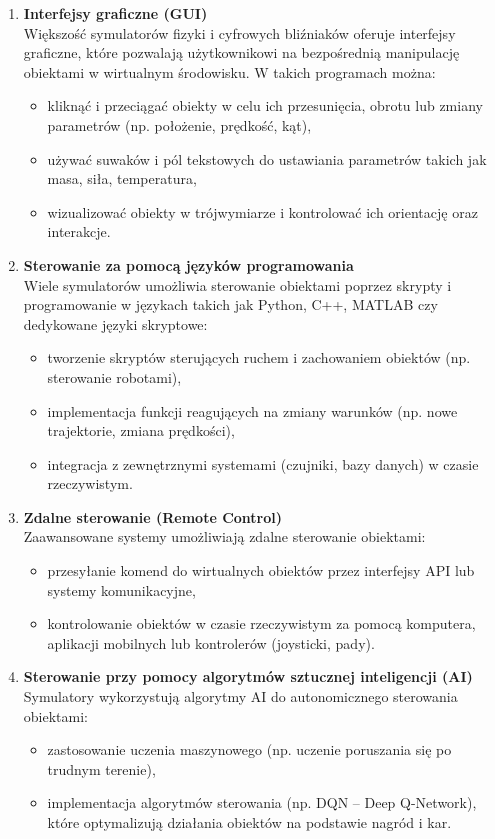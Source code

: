 \documentclass[12pt]{article}
\begin{document}
\begin{enumerate}
    \item \textbf{Interfejsy graficzne (GUI)} \\
    Większość symulatorów fizyki i cyfrowych bliźniaków oferuje interfejsy graficzne, które pozwalają użytkownikowi na bezpośrednią manipulację obiektami w wirtualnym środowisku. W takich programach można:
    \begin{itemize}
        \item kliknąć i przeciągać obiekty w celu ich przesunięcia, obrotu lub zmiany parametrów (np. położenie, prędkość, kąt),
        \item używać suwaków i pól tekstowych do ustawiania parametrów takich jak masa, siła, temperatura,
        \item wizualizować obiekty w trójwymiarze i kontrolować ich orientację oraz interakcje.
    \end{itemize}
    
    \item \textbf{Sterowanie za pomocą języków programowania} \\
    Wiele symulatorów umożliwia sterowanie obiektami poprzez skrypty i programowanie w językach takich jak Python, C++, MATLAB czy dedykowane języki skryptowe:
    \begin{itemize}
        \item tworzenie skryptów sterujących ruchem i zachowaniem obiektów (np. sterowanie robotami),
        \item implementacja funkcji reagujących na zmiany warunków (np. nowe trajektorie, zmiana prędkości),
        \item integracja z zewnętrznymi systemami (czujniki, bazy danych) w czasie rzeczywistym.
    \end{itemize}
    
    \item \textbf{Zdalne sterowanie (Remote Control)} \\
    Zaawansowane systemy umożliwiają zdalne sterowanie obiektami:
    \begin{itemize}
        \item przesyłanie komend do wirtualnych obiektów przez interfejsy API lub systemy komunikacyjne,
        \item kontrolowanie obiektów w czasie rzeczywistym za pomocą komputera, aplikacji mobilnych lub kontrolerów (joysticki, pady).
    \end{itemize}
    
    \item \textbf{Sterowanie przy pomocy algorytmów sztucznej inteligencji (AI)} \\
    Symulatory wykorzystują algorytmy AI do autonomicznego sterowania obiektami:
    \begin{itemize}
        \item zastosowanie uczenia maszynowego (np. uczenie poruszania się po trudnym terenie),
        \item implementacja algorytmów sterowania (np. DQN -- Deep Q-Network), które optymalizują działania obiektów na podstawie nagród i kar.
    \end{itemize}
    

\end{enumerate}
\end{document}
